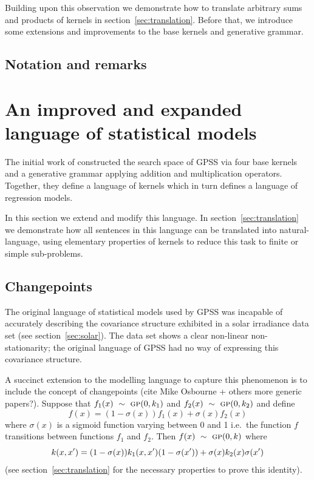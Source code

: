 \documentclass{article}
\def\ie{i.e.\ }
\begin{document}
Building upon this observation we demonstrate how to translate arbitrary sums and products of kernels in section~\ref{sec:translation}.
Before that, we introduce some extensions and improvements to the base kernels and generative grammar.

\subsection{Notation and remarks}



\section{An improved and expanded language of statistical models}
\label{sec:improvements}

The initial work of \cite{DuvLloGroetal13} constructed the search space of GPSS via four base kernels and a generative grammar applying addition and multiplication operators.
Together, they define a language of kernels which in turn defines a language of regression models.

In this section we extend and modify this language.
In section~\ref{sec:translation} we demonstrate how all sentences in this language can be translated into natural-language, using elementary properties of kernels to reduce this task to finite or simple sub-problems.

\subsection{Changepoints}

The original language of statistical models used by GPSS was incapable of accurately describing the covariance structure exhibited in a solar irradiance data set (see section~\ref{sec:solar}).
The data set shows a clear non-linear non-stationarity; the original language of GPSS had no way of expressing this covariance structure.

A succinct extension to the modelling language to capture this phenomenon is to include the concept of changepoints (cite Mike Osbourne + others more generic papers?).
Suppose that $f_1(x) \ \sim\  {\textsc{gp}}{}(0, k_1)$ and $f_2(x) \ \sim\  {\textsc{gp}}{}(0, k_2)$ and define
\begin{equation}
f(x) = (1-\sigma(x))f_1(x) + \sigma(x)f_2(x)
\end{equation}
where $\sigma(x)$ is a sigmoid function varying between 0 and 1 \ie the function $f$ transitions between functions $f_1$ and $f_2$.
Then $f(x) \ \sim\  {\textsc{gp}}{}(0,k)$ where
\begin{equation}
\kernel(x,x') = (1-\sigma(x))k_1(x,x')(1-\sigma(x')) + \sigma(x)k_2(x)\sigma(x')
\label{eq:cp}
\end{equation}
(see section~\ref{sec:translation} for the necessary properties to prove this identity).
\end{document}
